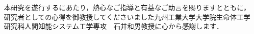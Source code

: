 本研究を遂行するにあたり，熱心なご指導と有益なご助言を賜りますとともに，研究者としての心得を御教授してくださいました九州工業大学大学院生命体工学研究科人間知能システム工学専攻　石井和男教授に心から感謝します．



